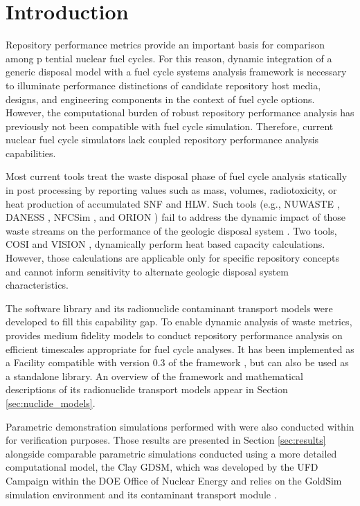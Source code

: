 \section{Introduction}\label{sec:introduction}
Repository performance metrics provide an important basis for comparison among
p tential nuclear fuel cycles.
For this reason, dynamic integration of a generic disposal model with a fuel 
cycle systems analysis framework is necessary to illuminate performance 
distinctions of candidate repository host media, designs, and engineering 
components in the context of fuel cycle options. 
However, the computational
burden of robust repository performance analysis has previously not been
compatible with fuel cycle simulation.
Therefore, current nuclear fuel cycle simulators
lack coupled repository performance analysis capabilities.

Most current tools treat the waste disposal
phase of fuel cycle analysis statically in post processing by reporting
values such as mass, volumes, radiotoxicity, or heat production of accumulated
\gls{SNF} and \gls{HLW}. Such tools
(e.g.,
\gls{NUWASTE} \cite{abkowitz_nuclear_2011},
\gls{DANESS} \cite{van_den_durpel_daness:_2006},
\gls{NFCSim} \cite{schneider_nfcsim_2004}, and
ORION \cite{gregg_orion_2011})
fail to address the dynamic impact of those waste streams on the performance of the
geologic disposal system \cite{wilson_comparing_2011}.  Two tools, \gls{COSI}
\cite{boucher_international_2010} and \gls{VISION} \cite{yacout_vision_2006,
wilson_comparing_2011, radel_repository_2007, boucher_international_2010},
dynamically perform heat based capacity calculations.
However, those calculations are applicable only for specific
repository concepts and cannot inform sensitivity to alternate geologic disposal
system characteristics.

The \Cyder software library \cite{huff_cyder_2013} and its radionuclide
contaminant transport models were  developed to fill this capability gap.  To
enable dynamic analysis of waste metrics, \Cyder provides medium fidelity
models to conduct repository performance analysis on efficient timescales
appropriate for fuel cycle analyses. It has been implemented as a Facility
compatible with version 0.3 of the \Cyclus framework
\cite{wilson_cyclus:_2012}, but can also be used as a standalone library. An
overview of the \Cyder framework and mathematical descriptions of its
radionuclide transport models appear in Section \ref{sec:nuclide_models}.

Parametric demonstration simulations performed with \Cyder were also conducted
within \Cyclus for verification purposes. Those results are presented in
Section \ref{sec:results} alongside comparable parametric simulations conducted
using a more detailed computational model, the Clay \gls{GDSM}, which was
developed by the \gls{UFD} Campaign within the \gls{DOE} Office of Nuclear
Energy \cite{clayton_generic_2011} and relies on the GoldSim simulation
environment \cite{golder_associates_goldsim_2010-1} and its contaminant
transport module \cite{golder_associates_goldsim_2010-1}.

